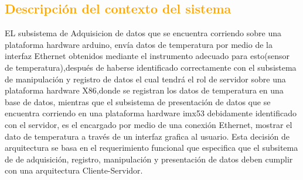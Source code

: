 \subsection{\textcolor{orange}{Descripción del contexto del sistema}}

EL subsistema de Adquisicion  de datos que se encuentra corriendo sobre una plataforma hardware arduino, envía datos de temperatura por medio de la interfaz Ethernet obtenidos mediante el instrumento adecuado para esto(sensor de temperatura),después de haberse identificado correctamente con el subsistema de manipulación y registro de datos el cual tendrá el rol de servidor sobre una plataforma hardware X86,donde se registran los datos de temperatura en una base de datos, mientras que el subsistema de presentación de datos que se encuentra corriendo en una plataforma hardware imx53 debidamente identificado con el servidor, es el encargado por medio de una conexión Ethernet, mostrar el dato de temperatura a través de un interfaz grafica al usuario. 
Esta decisión de arquitectura se basa en el requerimiento funcional que especifica que el subsitema de de adquisición, registro, manipulación y presentación de datos  deben cumplir con una arquitectura Cliente-Servidor. 

\newpage

